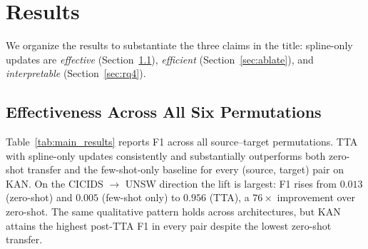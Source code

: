 \documentclass[10pt, conference, letterpaper]{IEEEtran}
\begin{document}
\section{Results}
\label{sec:results}

We organize the results to substantiate the three claims in the title: spline-only updates are \emph{effective} (Section~\ref{sec:eff}), \emph{efficient} (Section~\ref{sec:ablate}), and \emph{interpretable} (Section~\ref{sec:rq4}).

\subsection{Effectiveness Across All Six Permutations}
\label{sec:eff}

Table~\ref{tab:main_results} reports F1 across all source--target permutations. TTA with spline-only updates consistently and substantially outperforms both zero-shot transfer and the few-shot-only baseline for every (source, target) pair on KAN. On the CICIDS $\to$ UNSW direction the lift is largest: F1 rises from $0.013$ (zero-shot) and $0.005$ (few-shot only) to $0.956$ (TTA), a $76\times$ improvement over zero-shot. The same qualitative pattern holds across architectures, but KAN attains the highest post-TTA F1 in every pair despite the lowest zero-shot transfer.
\end{document}
